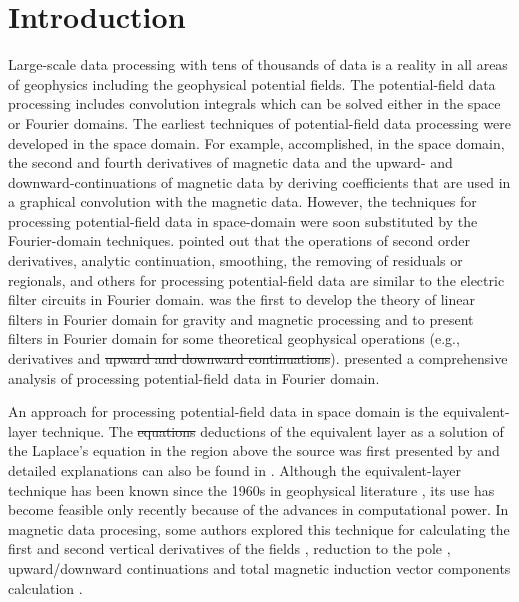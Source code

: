 \documentclass[manuscript]{geophysics}
\providecommand{\DIFaddtex}[1]{{\protect\color{blue}\uwave{#1}}} %
\providecommand{\DIFdeltex}[1]{{\protect\color{red}\sout{#1}}}                      %
\providecommand{\DIFaddbegin}{} %
\providecommand{\DIFaddend}{} %
\providecommand{\DIFdelbegin}{} %
\providecommand{\DIFdelend}{} %
\providecommand{\DIFadd}[1]{\texorpdfstring{\DIFaddtex{#1}}{#1}} %
\providecommand{\DIFdel}[1]{\texorpdfstring{\DIFdeltex{#1}}{}} %
\begin{document}
\section{Introduction}

Large-scale data processing with tens of thousands of data is a reality in all areas of geophysics including the geophysical potential fields. 
The potential-field data processing includes convolution integrals which can be solved either in the space or Fourier domains.
The earliest techniques of potential-field data processing  were developed in the space domain.
For example, \cite{Peters1949} accomplished, in the space domain, the second and fourth derivatives of magnetic data and the upward- and downward-continuations of magnetic data by deriving coefficients that are
used in a  graphical convolution with the magnetic data.
However, the techniques for  processing potential-field data in space-domain were soon substituted by the Fourier-domain techniques. 
\cite{Dean1958} pointed out that the operations of second order derivatives, analytic continuation, smoothing, the removing of residuals or regionals, and others for processing  potential-field data are
similar to the electric filter circuits in Fourier domain.
\cite{Dean1958} was the first to develop the theory of linear filters in Fourier domain for gravity and magnetic processing and to present filters in Fourier domain \citep[][ see Table I, p 113]{Dean1958} 
for some theoretical geophysical operations (e.g., derivatives and \DIFdelbegin \DIFdel{upward and downward continuations}\DIFdelend \DIFaddbegin \DIFadd{upward- and downward-continuations}\DIFaddend ).
\cite{GUNN1975} presented a comprehensive analysis of processing potential-field data in Fourier domain.


An approach for processing potential-field data in space domain is the equivalent-layer technique.
The \DIFdelbegin \DIFdel{equations }\DIFdelend deductions of the equivalent layer \DIFaddbegin \DIFadd{equations }\DIFaddend as a solution of the Laplace's equation in the region above the source was first presented by \cite{kellogg1929} and detailed explanations can also be found in \cite{blakely1996}. 
Although the equivalent-layer technique  has been known since the 1960s in geophysical literature \citep{danes1961structure,bott1967solution,dampney1969}, its use has become feasible only recently 
because of the advances in computational power.
In magnetic data procesing, some authors explored this technique for calculating the first and second vertical derivatives of the fields \citep{emilia1973}, reduction to the pole \citep{silva1986,oliveirajr-etal2013,li2014using}, upward/downward continuations \citep{hansen-miyazaki1984,li-oldenburg2010} and total magnetic induction vector components calculation \citep{sun2019constrained}.
\end{document}
